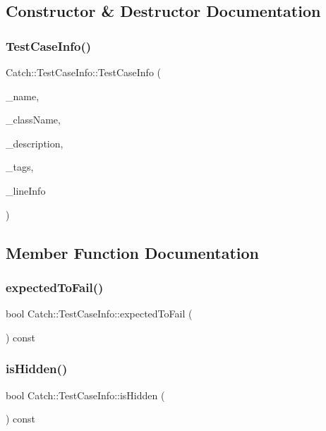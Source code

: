 \subsection{Constructor \& Destructor Documentation}
\mbox{\label{struct_catch_1_1_test_case_info_ad1a6b08b5a83d1c5eb4596b727b5305f}} 
\subsubsection{TestCaseInfo()}
{\footnotesize\ttfamily Catch\+::\+Test\+Case\+Info\+::\+Test\+Case\+Info (\begin{DoxyParamCaption}\item[{std\+::string const \&}]{\+\_\+name,  }\item[{std\+::string const \&}]{\+\_\+class\+Name,  }\item[{std\+::string const \&}]{\+\_\+description,  }\item[{std\+::vector$<$ std\+::string $>$ const \&}]{\+\_\+tags,  }\item[{\textbf{ Source\+Line\+Info} const \&}]{\+\_\+line\+Info }\end{DoxyParamCaption})}



\subsection{Member Function Documentation}
\mbox{\label{struct_catch_1_1_test_case_info_abe33d81233230cdae8afa714688e905b}} 
\subsubsection{expectedToFail()}
{\footnotesize\ttfamily bool Catch\+::\+Test\+Case\+Info\+::expected\+To\+Fail (\begin{DoxyParamCaption}{ }\end{DoxyParamCaption}) const}

\mbox{\label{struct_catch_1_1_test_case_info_a934b1a0952700743e99d62ec1731a2e2}} 
\subsubsection{isHidden()}
{\footnotesize\ttfamily bool Catch\+::\+Test\+Case\+Info\+::is\+Hidden (\begin{DoxyParamCaption}{ }\end{DoxyParamCaption}) const}

